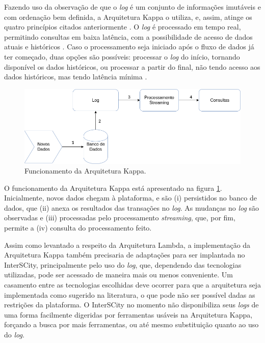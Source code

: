 Fazendo uso da observação de que o \textit{log} é um conjunto de informações
imutáveis e com ordenação bem definida, a Arquitetura Kappa o utiliza, e,
assim, atinge os quatro princípios citados anteriormente \cite{kreps2014}. O
\textit{log} é processado em tempo real, permitindo consultas em baixa
latência, com a possibilidade de acesso de dados atuais e históricos
\cite{forgeat2015}. Caso o processamento seja iniciado após o fluxo de dados já
ter começado, duas opções são possíveis: processar o \textit{log} do início,
tornando disponível os dados históricos, ou processar a partir do final,
não tendo acesso aos dados históricos, mas tendo latência mínima
\cite{kreps2014}.

\newpage

\begin{figure}
  \centering
    \includegraphics[scale=0.5]{figuras/kappa_architecture.png}
  \caption{Funcionamento da Arquitetura Kappa.}
  \label{fig:kappa-lifecycle}
\end{figure}

O funcionamento da Arquitetura Kappa está apresentado na figura
\ref{fig:kappa-lifecycle}. Inicialmente, novos dados chegam à plataforma, e são
(i) persistidos no banco de dados, que (ii) anexa os resultados das transações
no \textit{log}. As mudanças no \textit{log} são observadas e
(iii) processadas pelo processamento \textit{streaming}, que, por fim, permite
a (iv) consulta do processamento feito.

Assim como levantado a respeito da Arquitetura Lambda, a implementação da
Arquitetura Kappa também precisaria de adaptações para ser implantada no
InterSCity, principalmente pelo uso do \textit{log}, que, dependendo das
tecnologias utilizadas, pode ser acessado de maneira mais ou menos conveniente.
Um casamento entre as tecnologias escolhidas deve ocorrer para que a
arquitetura seja implementada como sugerido na literatura, o que pode não ser
possível dadas as restrições da plataforma. O InterSCity no momento não
disponibiliza seus \textit{logs} de uma forma facilmente digeridas por
ferramentas usáveis na Arquitetura Kappa, forçando a busca por mais ferramentas,
ou até mesmo substituição quanto ao uso do \textit{log}.

